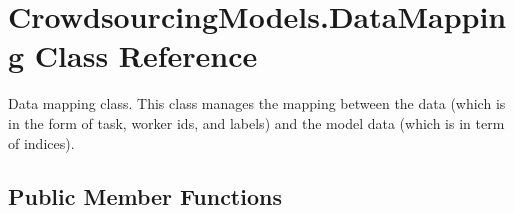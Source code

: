 \hypertarget{class_crowdsourcing_models_1_1_data_mapping}{}\section{Crowdsourcing\+Models.\+Data\+Mapping Class Reference}
\label{class_crowdsourcing_models_1_1_data_mapping}


Data mapping class. This class manages the mapping between the data (which is in the form of task, worker ids, and labels) and the model data (which is in term of indices).  


\subsection*{Public Member Functions}
